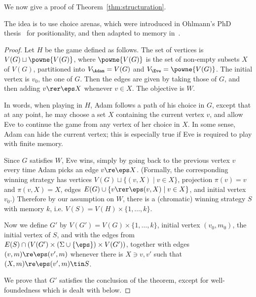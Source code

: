 We now give a proof of Theorem~\ref{thm:structuration}.

\structuration*

The idea is to use choice arenas, which were introduced in Ohlmann's PhD thesis~\cite[Section 3.2 in Chapter 3]{Ohlmann21PhD} for positionality, and then adapted to memory in~\cite{CO24Positional}.

\begin{proof}
    Let $H$ be the game defined as follows.
    The set of vertices is $V(G) \sqcup \powne{V(G)}$, where $\powne{V(G)}$ is the set of non-empty subsets $X$ of $V(G)$, partitioned into $V_\Adam = V(G)$ and $V_\Eve=\powne{V(G)}$.
    The initial vertex is $v_0$, the one of $G$.
    Then the edges are given by taking those of $G$, and then adding $v \rer \eps X$ whenever $v \in X$.
    The objective is $W$.

    In words, when playing in $H$, Adam follows a path of his choice in $G$, except that at any point, he may choose a set $X$ containing the current vertex $v$, and allow Eve to continue the game from any vertex of her choice in $X$.
    In some sense, Adam can hide the current vertex; this is especially true if Eve is required to play with finite memory.

    Since $G$ satisfies $W$, Eve wins, simply by going back to the previous vertex $v$ every time Adam picks an edge $v \re \eps X$.
    (Formally, the corresponding winning strategy has vertices $V(G) \sqcup \{(v,X) \mid v \in X\}$, projection $\pi(v)=v$ and $\pi(v,X)=X$, edges $E(G) \cup \{v \rer \eps (v,X) \mid v \in X\}$, and initial vertex $v_0$.)
    Therefore by our assumption on $W$, there is a (chromatic) winning strategy $S$ with memory $k$, i.e. $V(S)=V(H) \times \{1,\dots,k\}$.
    
    Now we define $G'$ by $V(G')=V(G) \times \{1,\dots,k\}$, initial vertex $(v_0,m_0)$, the initial vertex of $S$, and with the edges from $E(S) \cap (V(G') \times (\Sigma \cup \{\eps\}) \times V(G'))$, together with edges $(v,m) \re \eps (v',m)$ whenever there is $X \ni v,v'$ such that $(X,m) \re \eps (v',m) \tin S$.

    We prove that $G'$ satisfies the conclusion of the theorem, except for well-foundedness which is dealt with below.


\end{proof}
